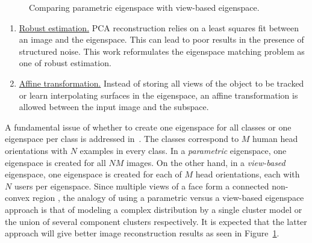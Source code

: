 \begin{figure}[t]
\caption{Comparing parametric eigenspace with view-based eigenspace.}								
\label{fig:parametric_vs_viewBased_eigenspace}				
\end{figure}

\begin{enumerate}
\item \underline{Robust estimation.}  PCA reconstruction relies on a least squares fit between an image and the eigenspace.  This can lead to poor results in the presence of structured noise.  This work reformulates the eigenspace matching problem as one of robust estimation.
\item \underline{Affine transformation.} Instead of storing all views of the object to be tracked or learn interpolating surfaces in the eigenspace, an affine transformation is allowed between the input image and the subspace.
\end{enumerate}

A fundamental issue of whether to create one eigenspace for all classes or one eigenspace per class is addressed in~\cite{1997_JNL_EigenTRK_Moghaddam}.  The classes correspond to $M$ human head orientations with $N$ examples in every class.  In a \emph{parametric} eigenspace, one eigenspace is created for all $NM$ images.  On the other hand, in a \emph{view-based} eigenspace, one eigenspace is created for each of $M$ head orientations, each with $N$ users per eigenspace.  Since multiple views of a face form a connected non-convex region \cite{1994_JNL_FaceTop_Bichsel}, the analogy of using a parametric versus a view-based eigenspace approach is that of modeling a complex distribution by a single cluster model or the union of several component clusters respectively.  It is expected that the latter approach will give better image reconstruction results as seen in Figure~\ref{fig:parametric_vs_viewBased_eigenspace}.  

